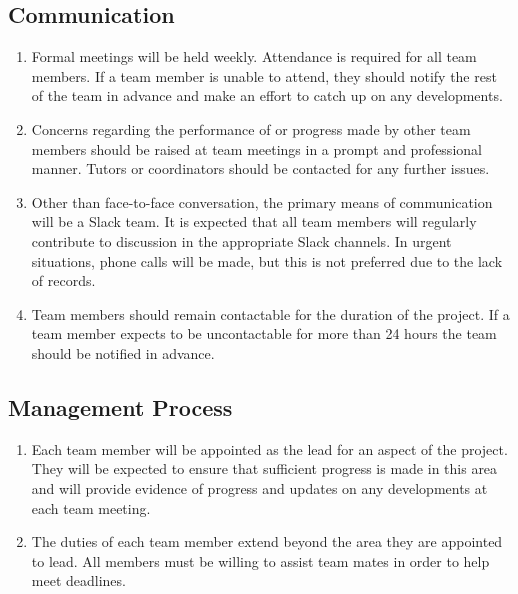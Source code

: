 \documentclass[a4paper]{article}
\begin{document}
\subsection{Communication}
\begin{enumerate}[label=(\alph*)]
	\item Formal meetings will be held weekly. Attendance is required for all team members. If a team member is unable to attend, they should notify the rest of the team in advance and make an effort to catch up on any developments.
	\item Concerns regarding the performance of or progress made by other team members should be raised at team meetings in a prompt and professional manner. Tutors or coordinators should be contacted for any further issues.
	\item Other than face-to-face conversation, the primary means of communication will be a Slack team. It is expected that all team members will regularly contribute to discussion in the appropriate Slack channels. In urgent situations, phone calls will be made, but this is not preferred due to the lack of records.
	\item Team members should remain contactable for the duration of the project. If a team member expects to be uncontactable for more than 24 hours the team should be notified in advance.

\end{enumerate}

\subsection{Management Process}
\begin{enumerate}[label=(\alph*)]
	\item Each team member will be appointed as the lead for an aspect of the project. They will be expected to ensure that sufficient progress is made in this area and will provide evidence of progress and updates on any developments at each team meeting.
	\item The duties of each team member extend beyond the area they are appointed to lead. All members must be willing to assist team mates in order to help meet deadlines.
\end{enumerate}
\end{document}
